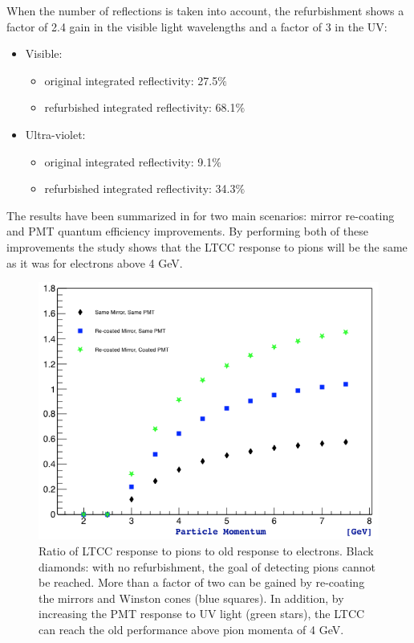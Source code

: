 When the number of reflections is taken into account, the refurbishment shows
a factor of 2.4 gain in the visible light wavelengths and a factor of 3 in the UV:

\begin{itemize}
	\item Visible:
	\begin{itemize}
		\item original integrated reflectivity: 27.5$\%$
		\item refurbished integrated reflectivity: 68.1$\%$
	\end{itemize}
	\item Ultra-violet:
	\begin{itemize}
		\item original integrated reflectivity: 9.1$\%$
		\item refurbished integrated reflectivity: 34.3$\%$
	\end{itemize}
\end{itemize}


The results have been summarized in  for two main scenarios: mirror re-coating and PMT quantum efficiency improvements.
By performing both of these improvements the study shows that the LTCC response to pions will be the same as it was for electrons above 4 GeV.

\begin{figure}
	\centering
	\includegraphics[width=0.99\columnwidth, height=0.7\columnwidth]{img/refurbishmentGains.png}
	\caption{Ratio of LTCC response to pions to old response to electrons. Black diamonds: with no refurbishment, the goal of detecting pions cannot be reached.
            More than a factor of two can be gained by re-coating the mirrors and Winston cones (blue squares). In addition, by increasing the
            PMT response to UV light (green stars), the LTCC can reach the old performance above pion momenta of 4 GeV.}
	\label{fig:refurbishmentGains}
\end{figure}

